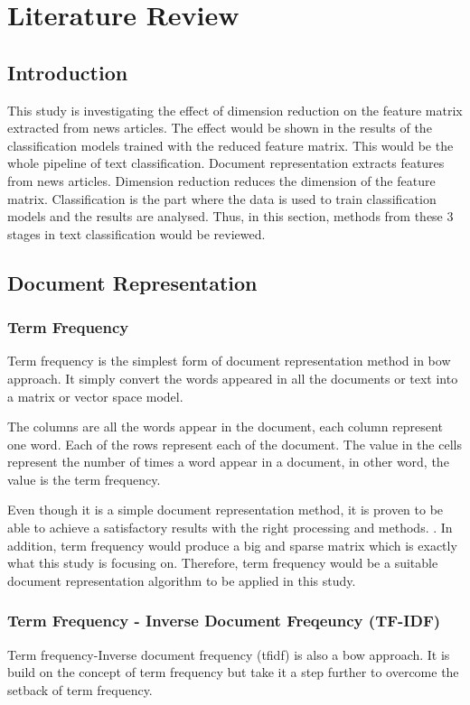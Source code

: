 \chapter{Literature Review}
\section{Introduction}
This study is investigating the effect of dimension reduction on the feature matrix extracted from news articles. The effect would be shown in the results of the classification models trained with the reduced feature matrix. This would be the whole pipeline of text classification. Document representation extracts features from news articles. Dimension reduction reduces the dimension of the feature matrix. Classification is the part where the data is used to train classification models and the results are analysed. Thus, in this section, methods from these 3 stages in text classification would be reviewed.\\

\section{Document Representation}
\subsection{Term Frequency}
Term frequency is the simplest form of document representation method in \ac{bow} approach. It simply convert the words appeared in all the documents or text into a matrix or vector space model.

The columns are all the words appear in the document, each column represent one word. Each of the rows represent each of the document. The value in the cells represent the number of times a word appear in a document, in other word, the value is the term frequency.

Even though it is a simple document representation method, it is proven to be able to achieve a satisfactory results with the right processing and methods. \cite{knnVectorSpaceReduction}. In addition, term frequency would produce a big and sparse matrix which is exactly what this study is focusing on. Therefore, term frequency would be a suitable document representation algorithm to be applied in this study.

\subsection{Term Frequency - Inverse Document Freqeuncy (TF-IDF)}
Term frequency-Inverse document frequency (\ac{tfidf}) is also a \ac{bow} approach. It is build on the concept of term frequency but take it a step further to overcome the setback of term frequency. 

